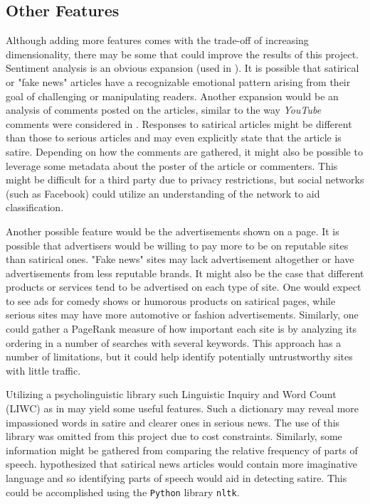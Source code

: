 \documentclass [12 pt] {report}
\begin{document}
\subsection{Other Features} \label{Other Features}
Although adding more features comes with the trade-off of increasing dimensionality, there may be some that could improve the results of this project. Sentiment analysis is an obvious expansion (used in \cite{digHumanities}). It is possible that satirical or "fake news" articles have a recognizable emotional pattern arising from their goal of challenging or manipulating readers. Another expansion would be an analysis of comments posted on the articles, similar to the way \textit{YouTube} comments were considered in \cite{digHumanities}. Responses to satirical articles might be different than those to serious articles and may even explicitly state that the article is satire. Depending on how the comments are gathered, it might also be possible to leverage some metadata about the poster of the article or commenters. This might be difficult for a third party due to privacy restrictions, but social networks (such as Facebook) could utilize an understanding of the network to aid classification.

Another possible feature would be the advertisements shown on a page. It is possible that advertisers would be willing to pay more to be on reputable sites than satirical ones. "Fake news" sites may lack advertisement altogether \cite{Wingfield} or have advertisements from less reputable brands. It might also be the case that different products or services tend to be advertised on each type of site. One would expect to see ads for comedy shows or humorous products on satirical pages, while serious sites may have more automotive or fashion advertisements. Similarly, one could gather a PageRank measure of how important each site is by analyzing its ordering in a number of searches with several keywords. This approach has a number of limitations, but it could help identify potentially untrustworthy sites with little traffic.

Utilizing a psycholinguistic library such Linguistic Inquiry and Word Count (LIWC) as in \cite{Yang} may yield some useful features. Such a dictionary may reveal more impassioned words in satire and clearer ones in serious news. The use of this library was omitted from this project due to cost constraints. Similarly, some information might be gathered from comparing the relative frequency of parts of speech. \cite{Yang} hypothesized that satirical news articles would contain more imaginative language and so identifying parts of speech would aid in detecting satire. This could be accomplished using the \texttt{Python} library \texttt{nltk}.
\end{document}
